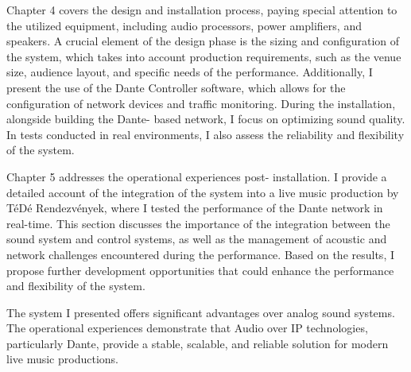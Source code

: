Chapter 4 covers the design and installation process, 
paying special attention to the utilized equipment, 
including audio processors, power amplifiers, and 
speakers. A crucial element of the design phase is 
the sizing and configuration of the system, which 
takes into account production requirements, such as 
the venue size, audience layout, and specific needs 
of the performance. Additionally, I present the use of 
the Dante Controller software, which allows for the 
configuration of network devices and traffic monitoring. 
During the installation, alongside building the Dante- 
based network, I focus on optimizing sound quality. 
In tests conducted in real environments, I also assess 
the reliability and flexibility of the system.

Chapter 5 addresses the operational experiences post- 
installation. I provide a detailed account of the 
integration of the system into a live music production 
by TéDé Rendezvények, where I tested the performance 
of the Dante network in real-time. This section discusses 
the importance of the integration between the sound 
system and control systems, as well as the management 
of acoustic and network challenges encountered during 
the performance. Based on the results, I propose further 
development opportunities that could enhance the 
performance and flexibility of the system.

The system I presented offers significant advantages 
over analog sound systems. The operational experiences 
demonstrate that Audio over IP technologies, particularly 
Dante, provide a stable, scalable, and reliable solution 
for modern live music productions.


\vfill
\selectthesislanguage

\setcounter{romanPage}{\value{page}}
